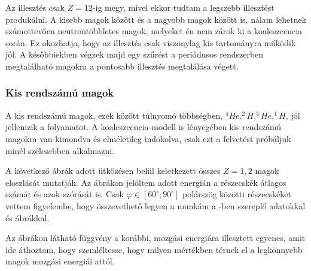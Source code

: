 \documentclass[a4paper,12pt]{article}
\begin{document}
\vspace{5mm}

\par Az illesztés csak $Z = 12$-ig megy, mivel ekkor tudtam a legszebb illesztést produkálni. A kisebb magok között és a nagyobb magok között is, nálam lehetnek számottevően neutrontöbbletes magok, melyeket én nem zárok ki a koaleszcencia során. Ez okozhatja, hogy az illesztés csak viszonylag kis tartományra működik jól. A későbbiekben végzek majd egy szűrést a periódusos rendszerben megtalálható magokra a pontosabb illesztés megtalálása végett.

\vspace{5mm}

\subsubsection{ Kis rendszámú magok }

\vspace{5mm}

\par A kis rendszámú magok, ezek között túlnyomó többségben, $^{4}He, ^{2}H, ^{3}He, ^{1}H$, jól jellemzik a folyamatot. A koaleszcencia-modell is lényegében kis rendszámú magokra van kimondva és elméletileg indokolva, csak ezt a felvetést próbáljuk minél szélesebben alkalmazni. 

\vspace{5mm}

\par A következő ábrák adott ütközésen belül keletkezett összes $Z = 1, 2$ magok eloszlását mutatják. Az ábrákon jelöltem adott energián a részecskék átlagos számát és azok szórását is. Csak $\varphi \in [60^{\circ};90^{\circ}]$ polárszög közötti részecskéket vettem figyelembe, hogy összevethető legyen a munkám a \cite{REISDORF1997493}-ben szereplő adatokkal és ábrákkal.

\vspace{5mm}

\par Az ábrákon látható függvény a korábbi, mozgási energiára illesztett egyenes, amit ide áthoztam, hogy szemléltesse, hogy milyen mértékben térnek el a legkönnyebb magok mozgási energiái attól.

\vspace{5mm}
\end{document}
